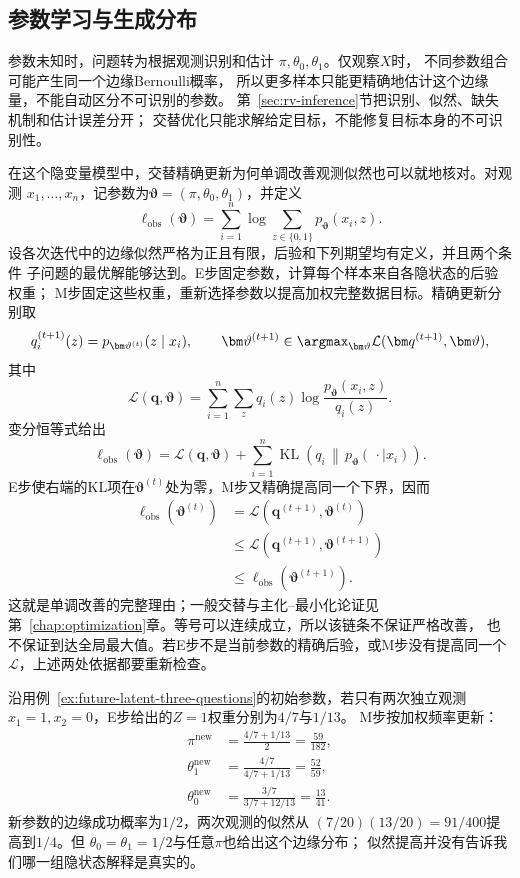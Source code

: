 \subsection{参数学习与生成分布}
\label{sec:future-parameter-estimation-sample-generation}

参数未知时，问题转为根据观测识别和估计
$\pi,\theta_0,\theta_1$。仅观察$X$时，
不同参数组合可能产生同一个边缘Bernoulli概率，
所以更多样本只能更精确地估计这个边缘量，不能自动区分不可识别的参数。
第~\ref{sec:rv-inference}节把识别、似然、缺失机制和估计误差分开；
交替优化只能求解给定目标，不能修复目标本身的不可识别性。

在这个隐变量模型中，交替精确更新为何单调改善观测似然也可以就地核对。对观测
\(x_1,\ldots,x_n\)，记参数为\(\bm\vartheta=(\pi,\theta_0,\theta_1)\)，并定义
\[
  \ell_{\mathrm{obs}}(\bm\vartheta)
  =
  \sum_{i=1}^{n}
  \log\sum_{z\in\{0,1\}}
  p_{\bm\vartheta}(x_i,z).
\]
设各次迭代中的边缘似然严格为正且有限，后验和下列期望均有定义，并且两个条件
子问题的最优解能够达到。E步固定参数，计算每个样本来自各隐状态的后验权重；
M步固定这些权重，重新选择参数以提高加权完整数据目标。精确更新分别取
\[
  q_i^{(t+1)}(z)
  =
  p_{\bm\vartheta^{(t)}}(z\mid x_i),
  \qquad
  \bm\vartheta^{(t+1)}
  \in
  \argmax_{\bm\vartheta}
  \mathcal L(\bm q^{(t+1)},\bm\vartheta),
\]
其中
\[
  \mathcal L(\bm q,\bm\vartheta)
  =
  \sum_{i=1}^{n}\sum_z
  q_i(z)
  \log
  \frac{p_{\bm\vartheta}(x_i,z)}{q_i(z)}.
\]
变分恒等式给出
\[
  \ell_{\mathrm{obs}}(\bm\vartheta)
  =
  \mathcal L(\bm q,\bm\vartheta)
  +
  \sum_{i=1}^{n}
  \operatorname{KL}\!\left(
    q_i\,\middle\|\,
    p_{\bm\vartheta}(\,\cdot\mid x_i)
  \right).
\]
E步使右端的KL项在\(\bm\vartheta^{(t)}\)处为零，M步又精确提高同一个下界，因而
\begin{align*}
  \ell_{\mathrm{obs}}(\bm\vartheta^{(t)})
  &=
  \mathcal L(\bm q^{(t+1)},\bm\vartheta^{(t)})
  \\
  &\leq
  \mathcal L(\bm q^{(t+1)},\bm\vartheta^{(t+1)})
  \\
  &\leq
  \ell_{\mathrm{obs}}(\bm\vartheta^{(t+1)}).
\end{align*}
这就是单调改善的完整理由；一般交替与主化--最小化论证见
第~\ref{chap:optimization}章。等号可以连续成立，所以该链条不保证严格改善，
也不保证到达全局最大值。若E步不是当前参数的精确后验，或M步没有提高同一个
\(\mathcal L\)，上述两处依据都要重新检查。

沿用例~\ref{ex:future-latent-three-questions}的初始参数，若只有两次独立观测
$x_1=1,x_2=0$，E步给出的$Z=1$权重分别为$4/7$与$1/13$。
M步按加权频率更新：
\begin{align*}
  \pi^{\mathrm{new}}&=\frac{4/7+1/13}{2}=\frac{59}{182},\\
  \theta_1^{\mathrm{new}}&=\frac{4/7}{4/7+1/13}=\frac{52}{59},\\
  \theta_0^{\mathrm{new}}&=\frac{3/7}{3/7+12/13}=\frac{13}{41}.
\end{align*}
新参数的边缘成功概率为$1/2$，两次观测的似然从
$(7/20)(13/20)=91/400$提高到$1/4$。但
$\theta_0=\theta_1=1/2$与任意$\pi$也给出这个边缘分布；
似然提高并没有告诉我们哪一组隐状态解释是真实的。

